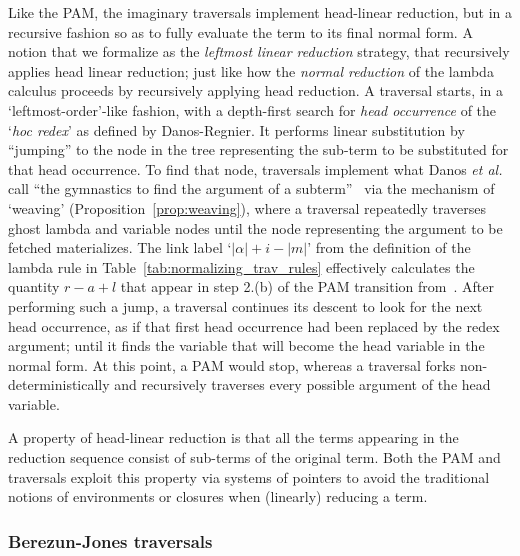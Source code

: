 \documentclass{elsarticle}
\makeatletter
\theoremstyle{plain}
\theoremstyle{definition}
\def\etal{\textit{et al.}\@\xspace}
\makeatother
\begin{document}
Like the PAM, the imaginary traversals implement head-linear reduction, but in a recursive fashion so as to fully evaluate the term to its final normal form.
A notion that we formalize as the \emph{leftmost linear reduction} strategy, that recursively applies head linear reduction; just like how the \emph{normal reduction} of the lambda calculus proceeds by recursively applying head reduction.
A traversal starts, in a `leftmost-order'-like fashion, with a depth-first search for \emph{head occurrence} of the `\emph{hoc redex}' as defined by Danos-Regnier. It performs linear substitution by ``jumping'' to the node in the tree representing the sub-term to be substituted for that head occurrence.
To find that node, traversals implement what Danos \etal call ``the gymnastics to find the argument of a subterm''~\cite{danos-head} via the mechanism of `weaving' (Proposition~\ref{prop:weaving}),
where a traversal repeatedly traverses ghost lambda and variable nodes until the node representing the argument to be fetched materializes.
The link label `$|\alpha|+i-|m|$' from the definition
of the lambda rule in Table~\ref{tab:normalizing_trav_rules} effectively calculates the quantity $r-a+l$ that appear in step 2.(b) of the PAM transition from~\cite{danos-head}.
After performing such a jump, a traversal continues its descent to look for the next head occurrence, as if that first head occurrence had been replaced by the redex argument; until it finds the variable that will become the head variable in the normal form. At this point, a PAM would stop, whereas a traversal forks  non-deterministically and recursively traverses every possible argument of the head variable.

A property of head-linear reduction is that all the terms appearing in the reduction sequence consist of sub-terms of the original term.
Both the PAM and traversals exploit this property via systems of pointers to avoid the traditional notions of environments or closures when (linearly) reducing a term.

\subsubsection{Berezun-Jones traversals}
\end{document}

